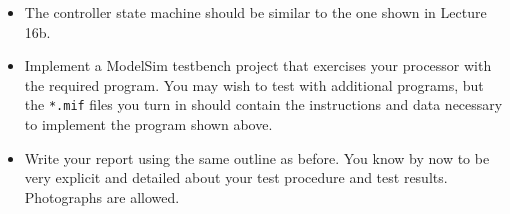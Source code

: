 \begin{itemize}
    \item The controller state machine should be similar to the one shown in Lecture 16b.
    \item Implement a ModelSim testbench project that exercises your processor with the required program.
    You may wish to test with additional programs,
    but the \verb|*.mif| files you turn in should contain the instructions
    and data necessary to implement the program shown above.
    \item Write your report using the same outline as before.
    You know by now to be very explicit and detailed about your test procedure and test results.
    Photographs are allowed.
\end{itemize}
